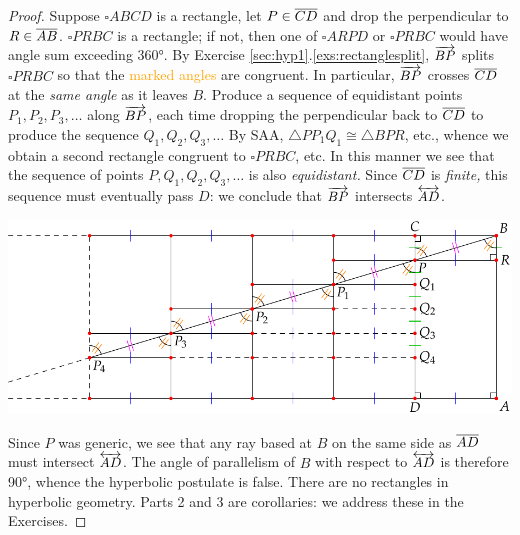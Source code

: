 \begin{proof}
Suppose $\square ABCD$ is a rectangle, let $P\in\overline{CD}$ and drop the perpendicular to $R\in\overline{AB}$.\smallbreak
$\square PRBC$ is a rectangle; if not, then one of $\square ARPD$ or $\square PRBC$ would have angle sum exceeding \ang{360}.\smallbreak
By Exercise \ref*{sec:hyp1}.\ref{exs:rectanglesplit}, $\overrightarrow{BP}$ splits $\square PRBC$ so that the \textcolor{orange}{marked angles} are congruent. In particular, $\overrightarrow{BP}$ crosses $\overline{CD}$ at the \emph{same angle} as it leaves $B$.\smallbreak
Produce a sequence of equidistant points $P_1,P_2,P_3,\ldots$ along $\overrightarrow{BP}$, each time dropping the perpendicular back to $\overline{CD}$ to produce the sequence $Q_1,Q_2,Q_3,\ldots$\smallbreak
By SAA, $\triangle PP_1Q_1\cong\triangle BPR$, etc., whence we obtain a second rectangle congruent to $\square PRBC$, etc. In this manner we see that the sequence of points $P,Q_1,Q_2,Q_3,\ldots$ is also \emph{equidistant.} Since $\overline{CD}$ is \emph{finite,} this sequence must eventually pass $D$: we conclude that $\overrightarrow{BP}$ intersects $\overleftrightarrow{AD}$.
\begin{center}
\includegraphics{basic-rect4}
\end{center}
Since $P$ was generic, we see that any ray based at $B$ on the same side as $\overline{AD}$ must intersect $\overleftrightarrow{AD}$. The angle of parallelism of $B$ with respect to $\overleftrightarrow{AD}$ is therefore \ang{90}, whence the hyperbolic postulate is false. There are no rectangles in hyperbolic geometry.\smallbreak
Parts 2 and 3 are corollaries: we address these in the Exercises.
\end{proof}

\goodbreak

